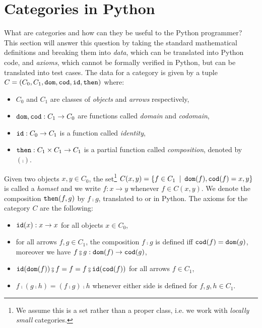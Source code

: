
\section{Categories in Python} \label{section:cat}

What are categories and how can they be useful to the Python programmer?
This section will answer this question by taking the standard mathematical definitions and breaking them into \emph{data}, which can be translated into Python code, and \emph{axioms}, which cannot be formally verified in Python, but can be translated into test cases.
The data for a category is given by a tuple $C = (C_0, C_1, \mathtt{dom}, \mathtt{cod}, \mathtt{id}, \mathtt{then})$ where:
\begin{itemize}
\item $C_0$ and $C_1$ are classes of \emph{objects} and \emph{arrows} respectively,
\item $\mathtt{dom}, \mathtt{cod} : C_1 \to C_0$ are functions called \emph{domain} and \emph{codomain},
\item $\mathtt{id} : C_0 \to C_1$ is a function called \emph{identity},
\item $\mathtt{then} : C_1 \times C_1 \to C_1$ is a partial function called \emph{composition}, denoted by $(\fcmp)$.
\end{itemize}
Given two objects $x, y \in C_0$, the set\footnote
{We assume this is a set rather than a proper class, i.e. we work with \emph{locally small} categories.}
$C(x, y) = \{f \in C_1 \enspace \vert \enspace \mathtt{dom}(f), \mathtt{cod}(f) = x, y \}$ is called a \emph{homset} and we write $f : x \to y$ whenever $f \in C(x, y)$.
We denote the composition $\mathtt{then}(f, g)$ by $f \fcmp g$, translated to  or  in Python.
The axioms for the category $C$ are the following:
\begin{itemize}
\item $\mathtt{id}(x) : x \to x$ for all objects $x \in C_0$,
\item for all arrows $f, g \in C_1$, the composition $f \fcmp g$ is defined iff $\mathtt{cod}(f) = \mathtt{dom}(g)$, moreover we have $f \fcmp g : \dom(f) \to \cod(g)$,
\item $\id(\dom(f)) \fcmp f = f = f \fcmp \id(\cod(f))$ for all arrows $f \in C_1$,
\item $f \fcmp (g \fcmp h) = (f \fcmp g) \fcmp h$ whenever either side is defined for $f, g, h \in C_1$.
\end{itemize}

